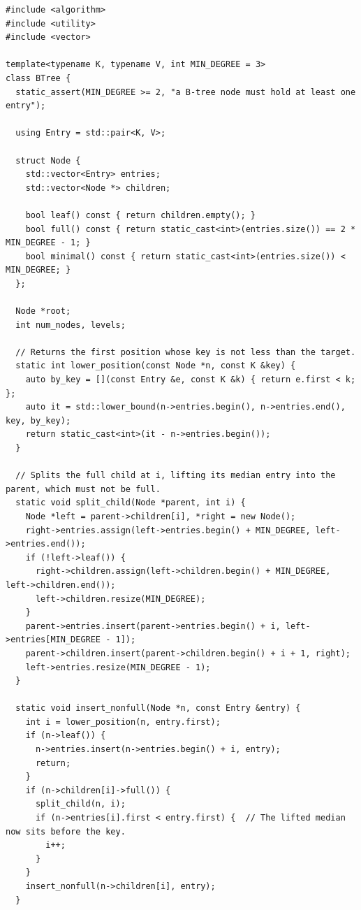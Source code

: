 \begin{lstlisting}[style=cpp]
#include <algorithm>
#include <utility>
#include <vector>

template<typename K, typename V, int MIN_DEGREE = 3>
class BTree {
  static_assert(MIN_DEGREE >= 2, "a B-tree node must hold at least one entry");

  using Entry = std::pair<K, V>;

  struct Node {
    std::vector<Entry> entries;
    std::vector<Node *> children;

    bool leaf() const { return children.empty(); }
    bool full() const { return static_cast<int>(entries.size()) == 2 * MIN_DEGREE - 1; }
    bool minimal() const { return static_cast<int>(entries.size()) < MIN_DEGREE; }
  };

  Node *root;
  int num_nodes, levels;

  // Returns the first position whose key is not less than the target.
  static int lower_position(const Node *n, const K &key) {
    auto by_key = [](const Entry &e, const K &k) { return e.first < k; };
    auto it = std::lower_bound(n->entries.begin(), n->entries.end(), key, by_key);
    return static_cast<int>(it - n->entries.begin());
  }

  // Splits the full child at i, lifting its median entry into the parent, which must not be full.
  static void split_child(Node *parent, int i) {
    Node *left = parent->children[i], *right = new Node();
    right->entries.assign(left->entries.begin() + MIN_DEGREE, left->entries.end());
    if (!left->leaf()) {
      right->children.assign(left->children.begin() + MIN_DEGREE, left->children.end());
      left->children.resize(MIN_DEGREE);
    }
    parent->entries.insert(parent->entries.begin() + i, left->entries[MIN_DEGREE - 1]);
    parent->children.insert(parent->children.begin() + i + 1, right);
    left->entries.resize(MIN_DEGREE - 1);
  }

  static void insert_nonfull(Node *n, const Entry &entry) {
    int i = lower_position(n, entry.first);
    if (n->leaf()) {
      n->entries.insert(n->entries.begin() + i, entry);
      return;
    }
    if (n->children[i]->full()) {
      split_child(n, i);
      if (n->entries[i].first < entry.first) {  // The lifted median now sits before the key.
        i++;
      }
    }
    insert_nonfull(n->children[i], entry);
  }


\end{lstlisting}
